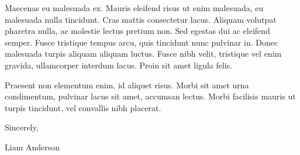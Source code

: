 \documentclass[letterpaper]{liam-cover} %
\begin{document}
Maecenas eu malesuada ex. Mauris eleifend risus ut enim malesuada, eu malesuada nulla tincidunt. Cras mattis consectetur lacus. Aliquam volutpat pharetra nulla, ac molestie lectus pretium non. Sed egestas dui ac eleifend semper. Fusce tristique tempus arcu, quis tincidunt nunc pulvinar in. Donec malesuada turpis aliquam aliquam luctus. Fusce nibh velit, tristique vel enim gravida, ullamcorper interdum lacus. Proin sit amet ligula felis. 


Praesent non elementum enim, id aliquet risus. Morbi sit amet urna condimentum, pulvinar lacus sit amet, accumsan lectus. Morbi facilisis mauris ut turpis tincidunt, vel convallis nibh placerat.
\vspace{0.5cm}

Sincerely,

Liam Anderson
\end{document}
